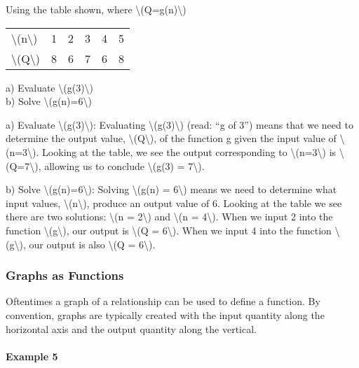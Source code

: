 Using the table shown, where \textbackslash{}(Q=g(n)\textbackslash{})

\begin{longtable}[]{@{}llllll@{}}
\toprule
\endhead
\textbackslash{}(n\textbackslash{}) & 1 & 2 & 3 & 4 & 5\tabularnewline
\textbackslash{}(Q\textbackslash{}) & 8 & 6 & 7 & 6 & 8\tabularnewline
\bottomrule
\end{longtable}

a) Evaluate \textbackslash{}(g(3)\textbackslash{})\\
b) Solve \textbackslash{}(g(n)=6\textbackslash{})

a) Evaluate \textbackslash{}(g(3)\textbackslash{}): Evaluating
\textbackslash{}(g(3)\textbackslash{}) (read: ``g of 3'') means that we
need to determine the output value, \textbackslash{}(Q\textbackslash{}),
of the function g given the input value of
\textbackslash{}(n=3\textbackslash{}). Looking at the table, we see the
output corresponding to \textbackslash{}(n=3\textbackslash{}) is
\textbackslash{}(Q=7\textbackslash{}), allowing us to conclude
\textbackslash{}(g(3) = 7\textbackslash{}).

b) Solve \textbackslash{}(g(n)=6\textbackslash{}): Solving
\textbackslash{}(g(n) = 6\textbackslash{}) means we need to determine
what input values, \textbackslash{}(n\textbackslash{}), produce an
output value of 6. Looking at the table we see there are two solutions:
\textbackslash{}(n = 2\textbackslash{}) and \textbackslash{}(n =
4\textbackslash{}). When we input 2 into the function
\textbackslash{}(g\textbackslash{}), our output is \textbackslash{}(Q =
6\textbackslash{}). When we input 4 into the function
\textbackslash{}(g\textbackslash{}), our output is also
\textbackslash{}(Q = 6\textbackslash{}).

\hypertarget{graphs-as-functions}{%
\subsubsection{Graphs as Functions}\label{graphs-as-functions}}

Oftentimes a graph of a relationship can be used to define a function.
By convention, graphs are typically created with the input quantity
along the horizontal axis and the output quantity along the vertical.

\hypertarget{example-5}{%
\paragraph{Example 5}\label{example-5}}

